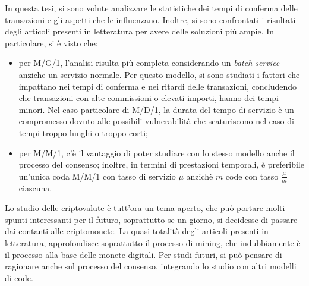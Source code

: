 In questa tesi, si sono volute analizzare le statistiche dei tempi di conferma delle transazioni e gli aspetti che le influenzano. Inoltre, si sono confrontati i risultati degli articoli presenti in letteratura per avere delle soluzioni più ampie. In particolare, si \`e visto che:
\begin{itemize}
\item per M/G/1, l'analisi risulta più completa considerando un \textit{batch service} anziche un servizio normale. Per questo modello, si sono studiati i fattori che impattano nei tempi di conferma e nei ritardi delle transazioni, concludendo che transazioni con alte commissioni o elevati importi, hanno dei tempi minori. Nel caso particolare di M/D/1, la durata del tempo di servizio \`e un compromesso dovuto alle possibili vulnerabilità che scaturiscono nel caso di tempi troppo lunghi o troppo corti;
\item per M/M/1, c'\`e il vantaggio di poter studiare con lo stesso modello anche il processo del consenso; inoltre, in termini di prestazioni temporali, \`e preferibile un'unica coda M/M/1 con tasso di servizio $\mu$ anzich\`e $m$ code con tasso $\frac{\mu}{m}$ ciascuna.
\end{itemize}
Lo studio delle criptovalute \`e tutt'ora un tema aperto, che può portare molti spunti interessanti per il futuro, soprattutto se un giorno, si decidesse di passare dai contanti alle criptomonete. La quasi totalità degli articoli presenti in letteratura, approfondisce soprattutto il processo di mining, che indubbiamente \`e il processo alla base delle monete digitali. Per studi futuri, si può pensare di ragionare anche sul processo del consenso, integrando lo studio con altri modelli di code.
